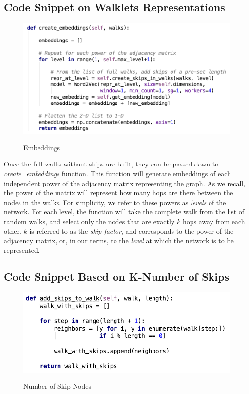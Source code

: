 \documentclass[a4paper,13pt]{article}
\begin{document}
\subsection{Code Snippet on Walklets Representations}
    \begin{figure}[h!]
        \center
         {\includegraphics[scale=0.5]{screen-shots/walklets_create_embeddings.png}}
        \caption{Embeddings}
        \label{fig:my_label}
    \end{figure}
    \FloatBarrier
Once the full walks without skips are built, they can be passed down to \textit{create\_embeddings} function. This function will generate embeddings of each independent power of the adjacency matrix representing the graph. As we recall, the power of the matrix will represent how many hops are there between the nodes in the walks. For simplicity, we refer to these powers as \textit{levels} of the network. For each level, the function will take the complete walk from the list of random walks, and select only the nodes that are exactly $k$ hops away from each other. $k$ is referred to as the \textit{skip-factor}, and corresponds to the power of the adjacency matrix, or, in our terms, to the \textit{level} at which the network is to be represented.


\subsection{Code Snippet Based on K-Number of Skips}
    \begin{figure}[h!]
        \center
         {\includegraphics[scale=0.6]{screen-shots/walklets_add_skips.png}}
        \caption{Number of Skip Nodes}
        \label{fig:my_label}
    \end{figure}
    \FloatBarrier
\end{document}
